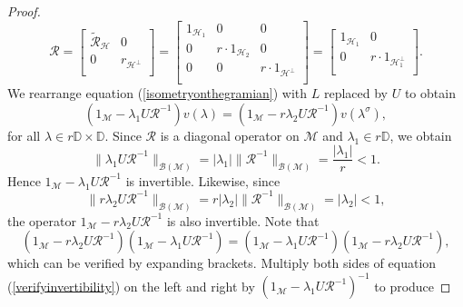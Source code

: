 \documentclass[12pt,reqno]{amsart}
\numberwithin{equation}{section}
\theoremstyle{definition}
\begin{document}
\begin{proof}
\begin{equation*}
\mathcal{R} = 
\begin{bmatrix}
	\widetilde{\mathcal{R}}_{\mathcal{H}}   	& 0                \\
	0 		& r_{\mathcal{H}^{\perp}}  	\\
\end{bmatrix} = 
\begin{bmatrix}
	1_{\mathcal{H}_{1}}   	& 0			& 0              \\
	0 		& r\cdot 1_{\mathcal{H}_{2}}		& 0		\\
	0		& 0					& r\cdot 1_{\mathcal{H}^{\perp}}	\\
\end{bmatrix} = 
\begin{bmatrix}
	1_{\mathcal{H}_{1}  } 	& 0                \\
	0 		& r\cdot 1_{\mathcal{H}_{1}^{\perp}}  	\\
\end{bmatrix}.
\end{equation*}
We rearrange equation (\ref{isometryonthegramian}) with $L$ replaced by $U$ to obtain 
\begin{equation}\label{equalitybetweenextension}
(1_{\mathcal{M}}-\lambda_{1}U\mathcal{R}^{-1})v({\lambda}) = (1_{\mathcal{M}}-r\lambda_{2}U\mathcal{R}^{-1})v({\lambda}^{\sigma}),
\end{equation}
for all $\lambda \in r\mathbb{D}\times\mathbb{D}$.
Since $\mathcal{R}$ is a diagonal operator on $\mathcal{M}$ and $\lambda_{1}\in r\mathbb{D}$, we obtain
$$\| \lambda_{1}U\mathcal{R}^{-1}\|_{\mathcal{B(M)}}  = \lvert \lambda_{1} \rvert \| \mathcal{R}^{-1} \|_{\mathcal{B(M)}} = \dfrac{\lvert \lambda_{1} \rvert}{r} < 1. $$
Hence $1_{\mathcal{M}}-\lambda_{1}U\mathcal{R}^{-1}$ is invertible. Likewise, since 
$$ \| r \lambda_{2} U\mathcal{R}^{-1}\|_{\mathcal{B(M)}} =r \lvert \lambda_{2}\rvert \| \mathcal{R}^{-1}\|_{\mathcal{B(M)}} = \lvert \lambda_{2} \rvert < 1,$$ 
the operator $1_{\mathcal{M}}-r\lambda_{2}U\mathcal{R}^{-1}$ is also invertible. Note that 
\begin{equation}\label{verifyinvertibility}
(1_{\mathcal{M}}-r\lambda_{2}U\mathcal{R}^{-1})(1_{\mathcal{M}}-\lambda_{1}U\mathcal{R}^{-1}) = (1_{\mathcal{M}}-\lambda_{1}U\mathcal{R}^{-1})(1_{\mathcal{M}}-r\lambda_{2}U\mathcal{R}^{-1}),
\end{equation}
which can be verified by expanding brackets. Multiply both sides of equation (\ref{verifyinvertibility}) on the left and right by $(1_{\mathcal{M}}-\lambda_{1}U\mathcal{R}^{-1})^{-1}$ to produce

\end{proof}
\end{document}
